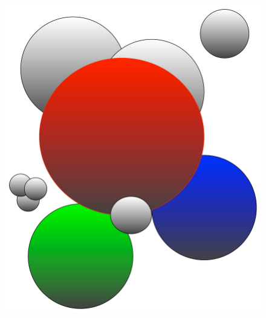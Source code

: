 \begin{figure}[ht!]
\begin{center}
\includegraphics[scale=0.25]{./images/boomerang_clusters.pdf}
\end{center}
\end{figure}
